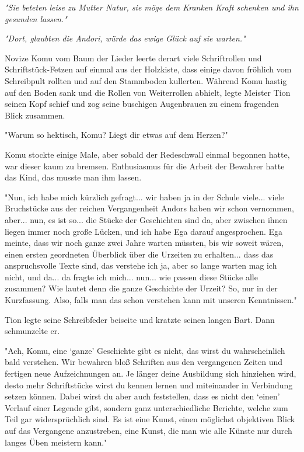 \textit{"Sie beteten leise zu Mutter Natur, sie möge dem Kranken Kraft schenken und ihn gesunden lassen."}

\trennzeichen

\textit{"Dort, glaubten die Andori, würde das ewige Glück auf sie warten."}



\trennzeichen



Novize Komu vom Baum der Lieder leerte derart viele Schriftrollen und Schriftstück-Fetzen auf einmal aus der Holzkiste, dass einige davon fröhlich vom Schreibpult rollten und auf den Stammboden kullerten. Während Komu hastig auf den Boden sank und die Rollen von Weiterrollen abhielt, legte Meister Tion seinen Kopf schief und zog seine buschigen Augenbrauen zu einem fragenden Blick zusammen.

"Warum so hektisch, Komu? Liegt dir etwas auf dem Herzen?"

Komu stockte einige Male, aber sobald der Redeschwall einmal begonnen hatte, war dieser kaum zu bremsen. Enthusiasmus für die Arbeit der Bewahrer hatte das Kind, das musste man ihm lassen.

"Nun, ich habe mich kürzlich gefragt... wir haben ja in der Schule viele... viele Bruchstücke aus der reichen Vergangenheit Andors haben wir schon vernommen, aber... nun, es ist so... die Stücke der Geschichten sind da, aber zwischen ihnen liegen immer noch große Lücken, und ich habe Ega darauf angesprochen. Ega meinte, dass wir noch ganze zwei Jahre warten müssten, bis wir soweit wären, einen ersten geordneten Überblick über die Urzeiten zu erhalten... dass das anspruchsvolle Texte sind, das verstehe ich ja, aber so lange warten mag ich nicht, und da... da fragte ich mich... nun... wie passen diese Stücke alle zusammen? Wie lautet denn die ganze Geschichte der Urzeit? So, nur in der Kurzfassung. Also, falls man das schon verstehen kann mit unseren Kenntnissen."

Tion legte seine Schreibfeder beiseite und kratzte seinen langen Bart. Dann schmunzelte er.

"Ach, Komu, eine ‘ganze’ Geschichte gibt es nicht, das wirst du wahrscheinlich bald verstehen. Wir bewahren bloß Schriften aus den vergangenen Zeiten und fertigen neue Aufzeichnungen an. Je länger deine Ausbildung sich hinziehen wird, desto mehr Schriftstücke wirst du kennen lernen und miteinander in Verbindung setzen können. Dabei wirst du aber auch feststellen, dass es nicht den ‘einen’ Verlauf einer Legende gibt, sondern ganz unterschiedliche Berichte, welche zum Teil gar widersprüchlich sind. Es ist eine Kunst, einen möglichst objektiven Blick auf das Vergangene anzustreben, eine Kunst, die man wie alle Künste nur durch langes Üben meistern kann."

